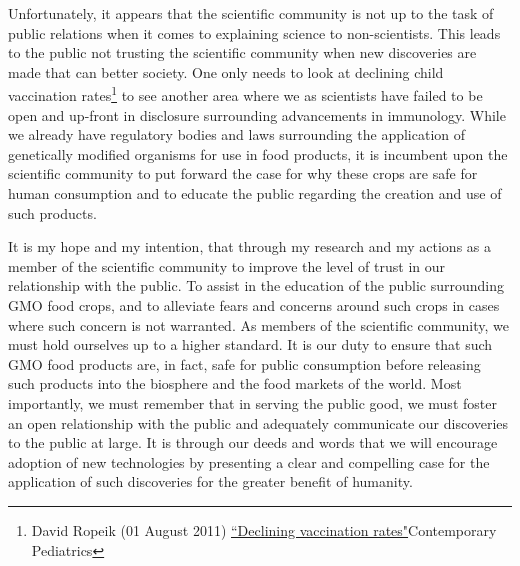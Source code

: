 \documentclass[letterpaper,10pt,twoside]{article}
\begin{document}
Unfortunately, it appears that the scientific community is not up to the task of public relations when it comes to explaining science to non-scientists.  This leads to the public not trusting the scientific community when new discoveries are made that can better society.  One only needs to look at declining child vaccination rates\footnote{ David Ropeik (01 August 2011) \href{http://contemporarypediatrics.modernmedicine.com/contemporary-pediatrics/news/modernmedicine/modern-medicine-now/declining-vaccination-rates}{``Declining vaccination rates"}Contemporary Pediatrics} to see another area where we as scientists have failed to be open and up-front in disclosure surrounding advancements in immunology.  While we already have regulatory bodies and laws surrounding the application of genetically modified organisms for use in food products, it is incumbent upon the scientific community to put forward the case for why these crops are safe for human consumption and to educate the public regarding the creation and use of such products.

It is my hope and my intention, that through my research and my actions as a member of the scientific community to improve the level of trust in our relationship with the public.  To assist in the education of the public surrounding GMO food crops, and to alleviate fears and concerns around such crops in cases where such concern is not warranted.  As members of the scientific community, we must hold ourselves up to a higher standard.  It is our duty to ensure that such GMO food products are, in fact, safe for public consumption before releasing such products into the biosphere and the food markets of the world.  Most importantly, we must remember that in serving the public good, we must foster an open relationship with the public and adequately communicate our discoveries to the public at large.  It is through our deeds and words that we will encourage adoption of new technologies by presenting a clear and compelling case for the application of such discoveries for the greater benefit of humanity.
\end{document}
